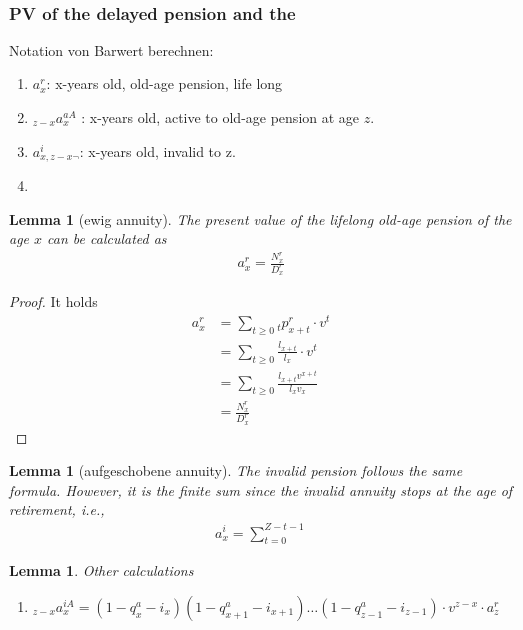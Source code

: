 \documentclass[a4paper,11pt]{book}
\newtheorem{lemma}[theorem]{Lemma}
\theoremstyle{definition}
\theoremstyle{remark}
\begin{document}
\quad\\

\subsubsection{PV of the delayed pension and the  }
Notation von Barwert berechnen: 

\begin{enumerate}
	\item $a_x^r$: x-years old, old-age pension, life long
	\item ${}_{z - x} a_x^{a A}$ : x-years old, active to old-age pension at age $z$.   
	\item $ a_{x, z - x\neg}^i$: x-years old, invalid to z. 
	\item 
\end{enumerate}



\begin{lemma}[ewig annuity]
	The present value of the lifelong old-age pension of the age $x$ can be calculated as 
	\begin{align*}
		a_x^r=  \frac{N_x^r}{D_x^r}
	\end{align*}
\end{lemma}
\begin{proof}
It holds
\begin{align*}
	a_x^r &= \sum_{t \ge 0} {}_tp_{x + t}^r \cdot v^t \\
	& = \sum_{t \ge 0} \frac{l_{x + t}}{l_x} \cdot v^t \\
	& = \sum_{ t \ge 0} \frac{l_{x + t} v^{x + t}}{l_x v_x} \\
	& = \frac{N_x^r}{D_x^r}
\end{align*}
\end{proof}

\begin{lemma}[aufgeschobene annuity]
	The invalid pension follows the same formula. However, it is the finite sum since the invalid annuity stops at the age of retirement, i.e., 
	\begin{align*}
		a_x^i = \sum_{t = 0}^{Z - t - 1}
	\end{align*}	
\end{lemma}

\begin{lemma}
	Other calculations
	\begin{enumerate}
		\item ${}_{z - x} a_x^{iA} = ( 1- q_x^a - i_x)(1 - q_{x + 1}^a - i_{x + 1}) \dots (1 - q_{z - 1}^a - i_{z - 1}) \cdot v^{z - x} \cdot a_z^r$
	\end{enumerate}
\end{lemma}
\end{document}
